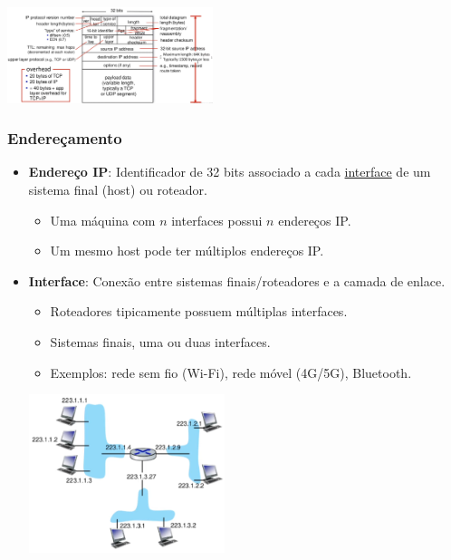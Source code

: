             \begin{center}
                \includegraphics[width=0.45\textwidth]{img/cap-04/formato-datagrama.png}
            \end{center}

        \subsubsection*{Endereçamento}
           
            \begin{itemize}[left=0.5cm, align=left, nosep]
                \item \textbf{Endereço IP}: Identificador de 32 bits associado a cada \underline{interface} de um sistema final (host) ou roteador.  
                \begin{itemize}[left=0.5cm, nosep, label=$\hookrightarrow$]
                    \item Uma máquina com \(n\) interfaces possui \(n\) endereços IP.
                    \item Um mesmo host pode ter múltiplos endereços IP.
                \end{itemize}

                \item \textbf{Interface}: Conexão entre sistemas finais/roteadores e a camada de enlace.  
                \begin{itemize}[left=0.5cm, nosep, label=$\hookrightarrow$]
                    \item Roteadores tipicamente possuem múltiplas interfaces.
                    \item Sistemas finais, uma ou duas interfaces.
                    \item Exemplos: rede sem fio (Wi-Fi), rede móvel (4G/5G), Bluetooth.
                \end{itemize}

                \begin{center}
                    \includegraphics[width=0.45\textwidth]{img/cap-04/introducao-endereco-ip.png}
                \end{center}


\end{itemize}

